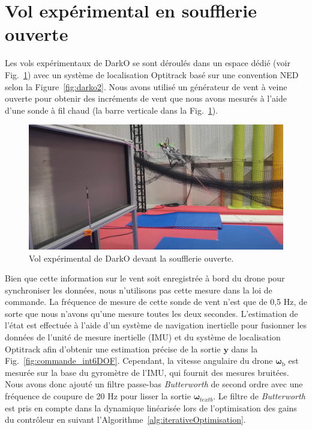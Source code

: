 \section{Vol expérimental en soufflerie ouverte} 
\label{sec:exp6DOF}

Les vols expérimentaux de DarkO se sont déroulés dans un espace dédié (voir Fig.~\ref{fig:flight_windshape}) avec un système de localisation Optitrack basé sur une convention NED selon la Figure~\ref{fig:darko2}. Nous avons utilisé un générateur de vent à veine ouverte pour obtenir des incréments de vent que nous avons mesurés à l'aide d'une sonde à fil chaud (la barre verticale dans la Fig.~\ref{fig:flight_windshape}). 
\begin{figure}[ht!]
    \centering
    \includegraphics[trim=0cm 0cm 0cm 0cm,clip,width=0.6\columnwidth]{figures/img_flight_darko.png}
    \caption{Vol expérimental de DarkO devant la soufflerie ouverte.}
    \label{fig:flight_windshape}
\end{figure}
Bien que cette information sur le vent soit enregistrée à bord du drone pour synchroniser les données, nous n'utilisons pas cette mesure dans la loi de commande. La fréquence de mesure de cette sonde de vent n'est que de 0,5 Hz, de sorte que nous n'avons qu'une mesure toutes les deux secondes. 
L'estimation de l'état est effectuée à l'aide d'un système de navigation inertielle pour fusionner les données de l'unité de mesure inertielle (IMU) et du système de localisation Optitrack afin d'obtenir une estimation précise de la sortie $\boldsymbol{y}$ dans la Fig.~\ref{fig:commande_int6DOF}. Cependant, la vitesse angulaire du drone $\boldsymbol{\omega}_{\text{b}}$ est mesurée sur la base du gyromètre de l'IMU, qui fournit des mesures bruitées. Nous avons donc ajouté un filtre passe-bas \textit{Butterworth} de second ordre avec une fréquence de coupure de 20 Hz pour lisser la sortie $\boldsymbol{\omega}_{text{b}}$. Le filtre de \textit{Butterworth} est pris en compte dans la dynamique linéarisée lors de l'optimisation des gains du contrôleur en suivant l'Algorithme~\ref{alg:iterativeOptimisation}. 

